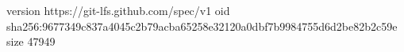 version https://git-lfs.github.com/spec/v1
oid sha256:9677349c837a4045c2b79acba65258e32120a0dbf7b9984755d6d2be82b2c59e
size 47949
